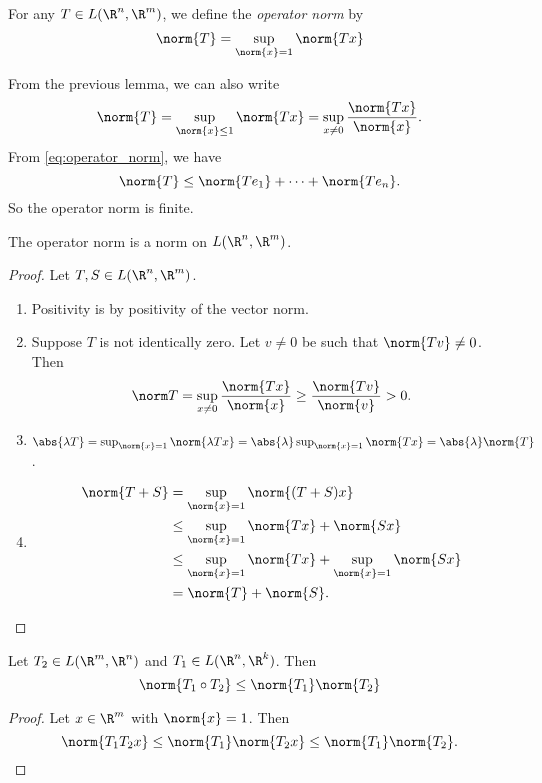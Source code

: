 \begin{definition*} \label{def:operator_norm}
    For any $T \in L(\R^n, \R^m)$, we define the \emph{operator norm} by \[
        \norm{T} = \sup_{\norm{x} = 1} \norm{Tx}
    \]
\end{definition*}
From the previous lemma, we can also write
\[
    \norm{T} = \sup_{\norm{x} \le 1} \norm{Tx}
        = \sup_{x \ne 0} \frac{\norm{Tx}}{\norm{x}}.
\]
From \cref{eq:operator_norm}, we have \[
    \norm{T} \le \norm{Te_1} + \cdots + \norm{Te_n}.
\] So the operator norm is finite.

\begin{proposition}
    The operator norm is a norm on $L(\R^n, \R^m)$.
\end{proposition}
\begin{proof}
    Let $T, S \in L(\R^n, \R^m)$.
    \begin{enumerate}[label=\small(N\arabic*)]
        \item Positivity is by positivity of the vector norm.
        \item Suppose $T$ is not identically zero.
            Let $v \ne 0$ be such that $\norm{Tv} \ne 0$.
            Then \[
                \norm T = \sup_{x \ne 0} \frac{\norm{Tx}}{\norm{x}}
                    \ge \frac{\norm{Tv}}{\norm{v}}
                    > 0.
            \]
        \item $\abs{\lambda T} = \sup_{\norm{x} = 1} \norm{\lambda Tx}
            = \abs{\lambda} \sup_{\norm{x} = 1} \norm{Tx}
            = \abs{\lambda} \norm{T}$.
        \item \begin{align*}
            \norm{T + S} &= \sup_{\norm{x} = 1} \norm{(T + S)x} \\
                &\le \sup_{\norm{x} = 1} \norm{Tx} + \norm{Sx} \\
                &\le \sup_{\norm{x} = 1} \norm{Tx}
                        + \sup_{\norm{x} = 1} \norm{Sx} \\
                &= \norm{T} + \norm{S}. \qedhere
        \end{align*}
    \end{enumerate}
\end{proof}

\begin{proposition}
    Let $T_2 \in L(\R^m, \R^n)$ and $T_1 \in L(\R^n, \R^k)$.
    Then \[
        \norm{T_1 \circ T_2} \le \norm{T_1} \norm{T_2}
    \]
\end{proposition}
\begin{proof}
    Let $x \in \R^m$ with $\norm{x} = 1$.
    Then \[
        \norm{T_1T_2 x} \le \norm{T_1} \norm{T_2 x}
                    \le \norm{T_1} \norm{T_2}. \qedhere
    \]
\end{proof}


